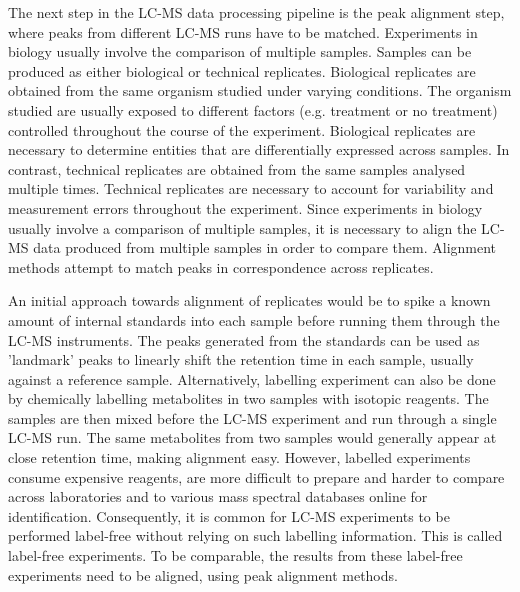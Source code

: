 The next step in the LC-MS data processing pipeline is the peak alignment step, where peaks from different LC-MS runs have to be matched. Experiments in biology usually involve the comparison of multiple samples. Samples can be produced as either biological or technical replicates. Biological replicates are obtained from the same organism studied under varying conditions. The organism studied are usually exposed to different factors (e.g. treatment or no treatment) controlled throughout the course of the experiment. Biological replicates are necessary to determine entities that are differentially expressed across samples. In contrast, technical replicates are obtained from the same samples analysed multiple times. Technical replicates are necessary to account for variability and measurement errors throughout the experiment. Since experiments in biology usually involve a comparison of multiple samples, it is necessary to align the LC-MS data produced from multiple samples in order to compare them. Alignment methods attempt to match peaks in correspondence across replicates. 

An initial approach towards alignment of replicates would be to spike a known amount of internal standards into each sample before running them through the LC-MS instruments. The peaks generated from the standards can be used as 'landmark' peaks to linearly shift the retention time in each sample, usually against a reference sample. Alternatively, labelling experiment can also be done by chemically labelling metabolites in two samples with isotopic reagents. The samples are then mixed before the LC-MS experiment and run through a single LC-MS run. The same metabolites from two samples would generally appear at close retention time, making alignment easy. However, labelled experiments consume expensive reagents, are more difficult to prepare and harder to compare across laboratories and to various mass spectral databases online for identification. Consequently, it is common for LC-MS experiments to be performed label-free without relying on such labelling information. This is called label-free experiments. To be comparable, the results from these label-free experiments need to be aligned, using peak alignment methods.

